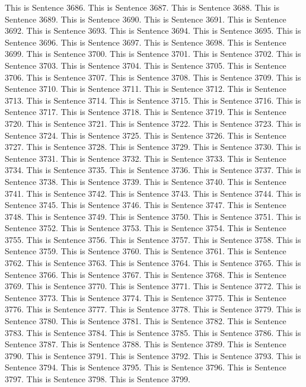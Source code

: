 \documentclass{article}
\begin{document}
This is Sentence 3686.
This is Sentence 3687.
This is Sentence 3688.
This is Sentence 3689.
This is Sentence 3690.
This is Sentence 3691.
This is Sentence 3692.
This is Sentence 3693.
This is Sentence 3694.
This is Sentence 3695.
This is Sentence 3696.
This is Sentence 3697.
This is Sentence 3698.
This is Sentence 3699.
This is Sentence 3700.
This is Sentence 3701.
This is Sentence 3702.
This is Sentence 3703.
This is Sentence 3704.
This is Sentence 3705.
This is Sentence 3706.
This is Sentence 3707.
This is Sentence 3708.
This is Sentence 3709.
This is Sentence 3710.
This is Sentence 3711.
This is Sentence 3712.
This is Sentence 3713.
This is Sentence 3714.
This is Sentence 3715.
This is Sentence 3716.
This is Sentence 3717.
This is Sentence 3718.
This is Sentence 3719.
This is Sentence 3720.
This is Sentence 3721.
This is Sentence 3722.
This is Sentence 3723.
This is Sentence 3724.
This is Sentence 3725.
This is Sentence 3726.
This is Sentence 3727.
This is Sentence 3728.
This is Sentence 3729.
This is Sentence 3730.
This is Sentence 3731.
This is Sentence 3732.
This is Sentence 3733.
This is Sentence 3734.
This is Sentence 3735.
This is Sentence 3736.
This is Sentence 3737.
This is Sentence 3738.
This is Sentence 3739.
This is Sentence 3740.
This is Sentence 3741.
This is Sentence 3742.
This is Sentence 3743.
This is Sentence 3744.
This is Sentence 3745.
This is Sentence 3746.
This is Sentence 3747.
This is Sentence 3748.
This is Sentence 3749.
This is Sentence 3750.
This is Sentence 3751.
This is Sentence 3752.
This is Sentence 3753.
This is Sentence 3754.
This is Sentence 3755.
This is Sentence 3756.
This is Sentence 3757.
This is Sentence 3758.
This is Sentence 3759.
This is Sentence 3760.
This is Sentence 3761.
This is Sentence 3762.
This is Sentence 3763.
This is Sentence 3764.
This is Sentence 3765.
This is Sentence 3766.
This is Sentence 3767.
This is Sentence 3768.
This is Sentence 3769.
This is Sentence 3770.
This is Sentence 3771.
This is Sentence 3772.
This is Sentence 3773.
This is Sentence 3774.
This is Sentence 3775.
This is Sentence 3776.
This is Sentence 3777.
This is Sentence 3778.
This is Sentence 3779.
This is Sentence 3780.
This is Sentence 3781.
This is Sentence 3782.
This is Sentence 3783.
This is Sentence 3784.
This is Sentence 3785.
This is Sentence 3786.
This is Sentence 3787.
This is Sentence 3788.
This is Sentence 3789.
This is Sentence 3790.
This is Sentence 3791.
This is Sentence 3792.
This is Sentence 3793.
This is Sentence 3794.
This is Sentence 3795.
This is Sentence 3796.
This is Sentence 3797.
This is Sentence 3798.
This is Sentence 3799.
\end{document}
